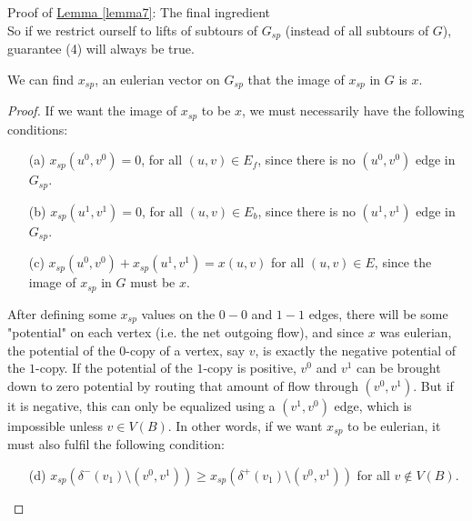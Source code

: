 \documentclass[./main.tex]{subfiles}
\begin{document}
\begin{subsection}{Proof of \hyperref[lemma7]{Lemma \ref{lemma7}}: The final ingredient}
		\\So if we restrict ourself to lifts of subtours of $G_{sp}$ (instead of all subtours of $G$), guarantee (4) will always be true.\vspace{2mm}
		\begin{lemma}
		\label{lemma6-1}		We can find $x_{sp}$, an eulerian vector on $G_{sp}$ that the image of $x_{sp}$ in $G$ is $x$.
		\end{lemma}
		\begin{proof}
		If we want the image of $x_{sp}$ to be $x$, we must necessarily have the following conditions:
		\begin{itemize}
			\item[(a)] $x_{sp}(u^0,v^0) = 0$, for all $(u,v)\in E_f$, since there is no $(u^0,v^0)$ edge in $G_{sp}$.
			\item[(b)] $x_{sp}(u^1,v^1) = 0$, for all $(u,v)\in E_b$, since there is no $(u^1,v^1)$ edge in $G_{sp}$.
			\item[(c)] $x_{sp}(u^0,v^0)+x_{sp}(u^1,v^1) = x(u,v)$ for all $(u,v)\in E$, since the image of $x_{sp}$ in $G$ must be $x$.
		\end{itemize}
\vspace{2mm}
After defining some $x_{sp}$ values on the $0-0$ and $1-1$ edges, there will be some "potential" on each vertex (i.e. the net outgoing flow), and since $x$ was eulerian, the potential of the $0$-copy of a vertex, say $v$, is exactly the negative potential of the $1$-copy.
		If the potential of the $1$-copy is positive, $v^0$ and $v^1$ can be brought down to zero potential by routing that amount of flow through $(v^0,v^1)$. 
		But if it is negative, this can only be equalized using a $(v^1,v^0)$ edge, which is impossible unless $v\in V(B)$. In other words, if we want $x_{sp}$ to be eulerian, it must also fulfil the following condition:
		\begin{itemize}
			\item[(d)] $x_{sp}(\delta^-(v_1)\setminus (v^0,v^1) )\geq x_{sp}(\delta^+(v_1)\setminus (v^0,v^1))$ for all $v\notin V(B)$.
		\end{itemize}


\end{proof}
\end{subsection}
\end{document}
